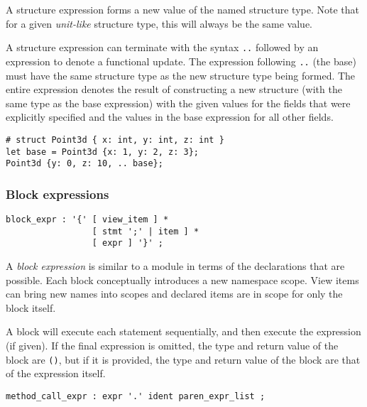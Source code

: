 \documentclass[]{article}
\begin{document}
A structure expression forms a new value of the named structure type.
Note that for a given \emph{unit-like} structure type, this will always
be the same value.

A structure expression can terminate with the syntax \texttt{..}
followed by an expression to denote a functional update. The expression
following \texttt{..} (the base) must have the same structure type as
the new structure type being formed. The entire expression denotes the
result of constructing a new structure (with the same type as the base
expression) with the given values for the fields that were explicitly
specified and the values in the base expression for all other fields.

\begin{verbatim}
# struct Point3d { x: int, y: int, z: int }
let base = Point3d {x: 1, y: 2, z: 3};
Point3d {y: 0, z: 10, .. base};
\end{verbatim}

\subsubsection{Block expressions}\label{block-expressions}

\begin{verbatim}
block_expr : '{' [ view_item ] *
                 [ stmt ';' | item ] *
                 [ expr ] '}' ;
\end{verbatim}

A \emph{block expression} is similar to a module in terms of the
declarations that are possible. Each block conceptually introduces a new
namespace scope. View items can bring new names into scopes and declared
items are in scope for only the block itself.

A block will execute each statement sequentially, and then execute the
expression (if given). If the final expression is omitted, the type and
return value of the block are \texttt{()}, but if it is provided, the
type and return value of the block are that of the expression itself.


\begin{verbatim}
method_call_expr : expr '.' ident paren_expr_list ;
\end{verbatim}
\end{document}
